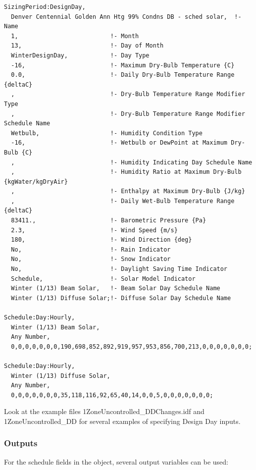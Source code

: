 \begin{lstlisting}
SizingPeriod:DesignDay,
  Denver Centennial Golden Ann Htg 99% Condns DB - sched solar,  !- Name
  1,                          !- Month
  13,                         !- Day of Month
  WinterDesignDay,            !- Day Type
  -16,                        !- Maximum Dry-Bulb Temperature {C}
  0.0,                        !- Daily Dry-Bulb Temperature Range {deltaC}
  ,                           !- Dry-Bulb Temperature Range Modifier Type
  ,                           !- Dry-Bulb Temperature Range Modifier Schedule Name
  Wetbulb,                    !- Humidity Condition Type
  -16,                        !- Wetbulb or DewPoint at Maximum Dry-Bulb {C}
  ,                           !- Humidity Indicating Day Schedule Name
  ,                           !- Humidity Ratio at Maximum Dry-Bulb {kgWater/kgDryAir}
  ,                           !- Enthalpy at Maximum Dry-Bulb {J/kg}
  ,                           !- Daily Wet-Bulb Temperature Range {deltaC}
  83411.,                     !- Barometric Pressure {Pa}
  2.3,                        !- Wind Speed {m/s}
  180,                        !- Wind Direction {deg}
  No,                         !- Rain Indicator
  No,                         !- Snow Indicator
  No,                         !- Daylight Saving Time Indicator
  Schedule,                   !- Solar Model Indicator
  Winter (1/13) Beam Solar,   !- Beam Solar Day Schedule Name
  Winter (1/13) Diffuse Solar;!- Diffuse Solar Day Schedule Name

Schedule:Day:Hourly,
  Winter (1/13) Beam Solar,
  Any Number,
  0,0,0,0,0,0,0,190,698,852,892,919,957,953,856,700,213,0,0,0,0,0,0,0;

Schedule:Day:Hourly,
  Winter (1/13) Diffuse Solar,
  Any Number,
  0,0,0,0,0,0,0,35,118,116,92,65,40,14,0,0,5,0,0,0,0,0,0,0;
\end{lstlisting}

Look at the example files 1Zone\-Un\-controll\-ed\_\-DD\-Changes.idf and 1Zone\-Un\-controlled\_\-DD for several examples of specifying Design Day inputs.

\subsubsection{Outputs}\label{outputs-018}

For the schedule fields in the object, several output variables can be used:

